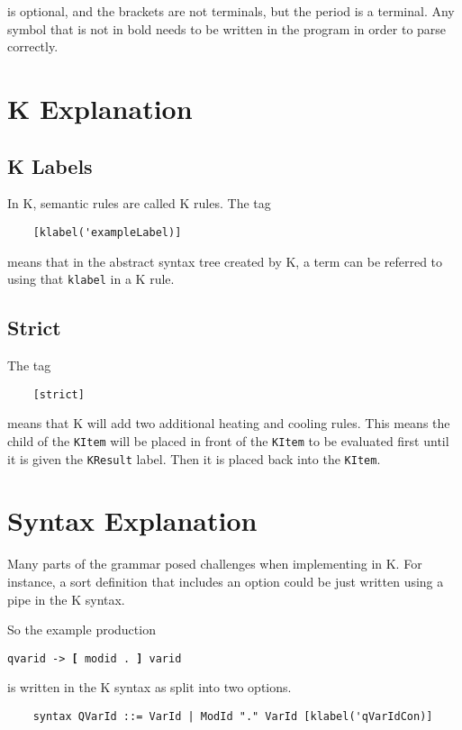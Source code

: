 \noindent
is optional, and the brackets are not terminals, but the period is a terminal. Any symbol that is not in bold needs to be written in the program in order to parse correctly.

\section{K Explanation}
\subsection{K Labels}
In K, semantic rules are called K rules. The tag

\begin{lstlisting}
	[klabel('exampleLabel)]
\end{lstlisting}

\noindent
means that in the abstract syntax tree created by K, a term can be referred to using that \texttt{klabel} in a K rule.

\subsection{Strict}
The tag

\begin{lstlisting}
	[strict]
\end{lstlisting}

\noindent
means that K will add two additional heating and cooling rules. This means the child of the \texttt{KItem} will be placed in front of the \texttt{KItem} to be evaluated first until it is given the \texttt{KResult} label. Then it is placed back into the \texttt{KItem}.

\section{Syntax Explanation}
Many parts of the grammar posed challenges when implementing in K. For instance, a sort definition that includes an option could be just written using a pipe
in the K syntax.

So the example production

\texttt{qvarid -> \textbf{[} modid . \textbf{]} varid}

\noindent
is written in the K syntax as split into two options.

\begin{lstlisting}
	syntax QVarId ::= VarId | ModId "." VarId [klabel('qVarIdCon)]
\end{lstlisting}

